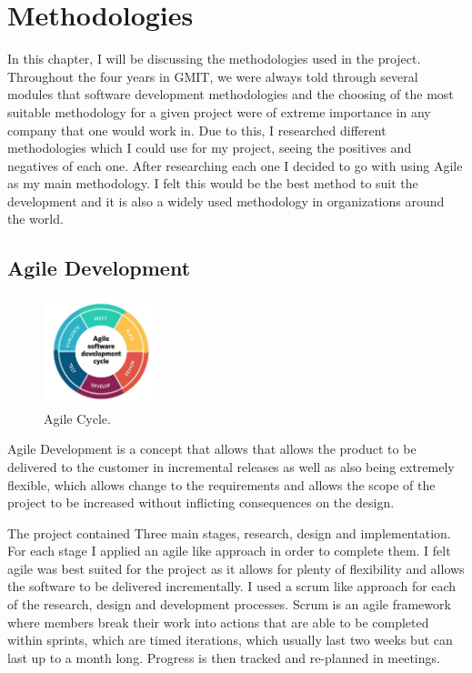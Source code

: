 \chapter{Methodologies}
 In this chapter, I will be discussing the methodologies used in the project. Throughout the four years in GMIT, we were always told through several modules that software development methodologies and the choosing of the most suitable methodology for a given project were of extreme importance in any company that one would work in. Due to this, I researched different methodologies which I could use for my project, seeing the positives and negatives of each one. After researching each one I decided to go with using Agile as my main methodology. I felt this would be the best method to suit the development and it is also a widely used methodology in organizations around the world.

\section{Agile Development}
\begin{figure} %
    \centering
    \includegraphics[width=0.3\textwidth]{Images/agile-software-development.jpg}
    \caption{Agile Cycle.}
  \label{fig:Agile Cycle}
\end{figure}
 Agile Development is a concept that allows that allows the product to be delivered to the customer in incremental releases as well as also being extremely flexible, which allows change to the requirements and allows the scope of the project to be increased without inflicting consequences on the design.

 The project contained Three main stages, research, design and implementation. For each stage I applied an agile like approach in order to complete them. I felt agile was best suited for the project as it allows for plenty of flexibility and allows the software to be delivered incrementally. I used a scrum like approach for each of the research, design and development processes. Scrum is an agile framework where members break their work into actions that are able to be completed within sprints, which are timed iterations, which usually last two weeks but can last up to a month long. Progress is then tracked and re-planned in meetings. \cite{AboutAgile}

